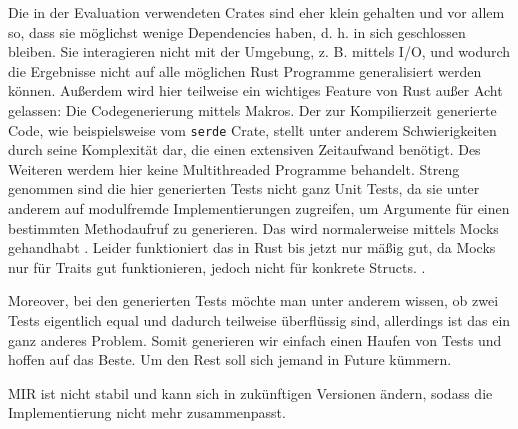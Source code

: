 \documentclass{article}
\begin{document}
Die in der Evaluation verwendeten Crates sind eher klein gehalten und vor allem so, dass sie möglichst wenige Dependencies haben, d. h. in sich geschlossen bleiben. Sie interagieren nicht mit der Umgebung, z. B. mittels I/O, und wodurch die Ergebnisse nicht auf alle möglichen Rust Programme generalisiert werden können. Außerdem wird hier teilweise ein wichtiges Feature von Rust außer Acht gelassen: Die Codegenerierung mittels Makros. Der zur Kompilierzeit generierte Code, wie beispielsweise vom \lstinline{serde} Crate, stellt unter anderem Schwierigkeiten durch seine Komplexität dar, die einen extensiven Zeitaufwand benötigt. Des Weiteren werdem hier keine Multithreaded Programme behandelt. Streng genommen sind die hier generierten Tests nicht ganz Unit Tests, da sie unter anderem auf modulfremde Implementierungen zugreifen, um Argumente für einen bestimmten Methodaufruf zu generieren. Das wird normalerweise mittels Mocks gehandhabt . Leider funktioniert das in Rust bis jetzt nur mäßig gut, da Mocks nur für Traits gut funktionieren, jedoch nicht für konkrete Structs. .

Moreover, bei den generierten Tests möchte man unter anderem wissen, ob zwei Tests eigentlich equal und dadurch teilweise überflüssig sind, allerdings ist das ein ganz anderes Problem. Somit generieren wir einfach einen Haufen von Tests und hoffen auf das Beste. Um den Rest soll sich jemand in Future kümmern.

MIR ist nicht stabil und kann sich in zukünftigen Versionen ändern, sodass die Implementierung nicht mehr zusammenpasst.
\end{document}
